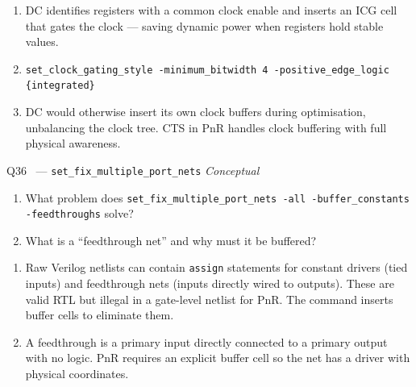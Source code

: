 \documentclass[12pt,a4paper]{article}
\newcommand{\moderate}{%
  \fbox{\textcolor{modoran}{\bfseries\sffamily\small MODERATE}}}
\begin{document}
\begin{answerbox}
\begin{enumerate}[label=\textbf{\alph*)}]
  \item DC identifies registers with a common clock enable and inserts an ICG cell that gates the clock --- saving dynamic power when registers hold stable values.
  \item \texttt{set\_clock\_gating\_style -minimum\_bitwidth 4 -positive\_edge\_logic \{integrated\}}
  \item DC would otherwise insert its own clock buffers during optimisation, unbalancing the clock tree. CTS in PnR handles clock buffering with full physical awareness.
\end{enumerate}
\end{answerbox}

\begin{questionbox}{Q36 \moderate\ --- \texttt{set\_fix\_multiple\_port\_nets} \hfill\textit{Conceptual}}
\begin{enumerate}[label=\textbf{\alph*)}]
  \item What problem does \texttt{set\_fix\_multiple\_port\_nets -all -buffer\_constants -feedthroughs} solve?
  \item What is a ``feedthrough net'' and why must it be buffered?
\end{enumerate}
\end{questionbox}

\begin{answerbox}
\begin{enumerate}[label=\textbf{\alph*)}]
  \item Raw Verilog netlists can contain \texttt{assign} statements for constant drivers (tied inputs) and feedthrough nets (inputs directly wired to outputs). These are valid RTL but illegal in a gate-level netlist for PnR. The command inserts buffer cells to eliminate them.
  \item A feedthrough is a primary input directly connected to a primary output with no logic. PnR requires an explicit buffer cell so the net has a driver with physical coordinates.
\end{enumerate}
\end{answerbox}
\end{document}

